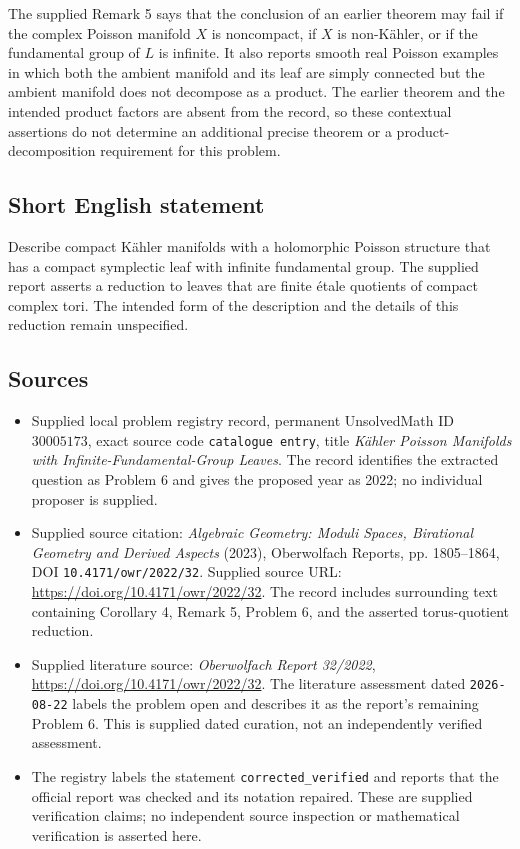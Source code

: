 \documentclass[11pt]{article}
\begin{document}
The supplied Remark 5 says that the conclusion of an earlier theorem may fail if the complex Poisson manifold \(X\) is noncompact, if \(X\) is non-Kähler, or if the fundamental group of \(L\) is infinite. It also reports smooth real Poisson examples in which both the ambient manifold and its leaf are simply connected but the ambient manifold does not decompose as a product. The earlier theorem and the intended product factors are absent from the record, so these contextual assertions do not determine an additional precise theorem or a product-decomposition requirement for this problem.
\subsection{Short English statement}
Describe compact Kähler manifolds with a holomorphic Poisson structure that has a compact symplectic leaf with infinite fundamental group. The supplied report asserts a reduction to leaves that are finite étale quotients of compact complex tori. The intended form of the description and the details of this reduction remain unspecified.
\subsection{Sources}
\begin{itemize}
\item Supplied local problem registry record, permanent UnsolvedMath ID \(30005173\), exact source code \texttt{catalogue entry}, title \emph{Kähler Poisson Manifolds with Infinite-Fundamental-Group Leaves}. The record identifies the extracted question as Problem 6 and gives the proposed year as 2022; no individual proposer is supplied.
\item Supplied source citation: \emph{Algebraic Geometry: Moduli Spaces, Birational Geometry and Derived Aspects} (2023), Oberwolfach Reports, pp. 1805--1864, DOI \texttt{10.4171/owr/2022/32}. Supplied source URL: \url{https://doi.org/10.4171/owr/2022/32}. The record includes surrounding text containing Corollary 4, Remark 5, Problem 6, and the asserted torus-quotient reduction.
\item Supplied literature source: \emph{Oberwolfach Report 32/2022}, \url{https://doi.org/10.4171/owr/2022/32}. The literature assessment dated \texttt{2026-08-22} labels the problem open and describes it as the report's remaining Problem 6. This is supplied dated curation, not an independently verified assessment.
\item The registry labels the statement \texttt{corrected\_verified} and reports that the official report was checked and its notation repaired. These are supplied verification claims; no independent source inspection or mathematical verification is asserted here.
\end{itemize}
\end{document}
